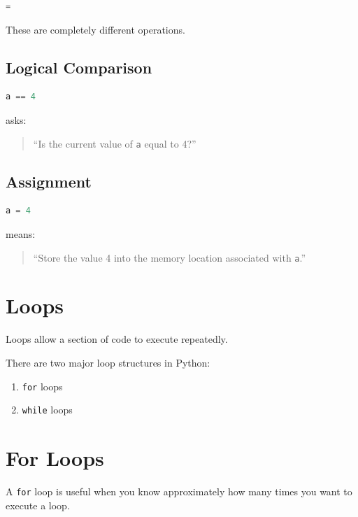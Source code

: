 \documentclass[11pt]{article}
\begin{document}
\begin{lstlisting}[language=Python]
=
\end{lstlisting}

These are completely different operations.

\subsection{Logical Comparison}

\begin{lstlisting}[language=Python]
a == 4
\end{lstlisting}

asks:

\begin{quote}
``Is the current value of \texttt{a} equal to 4?''
\end{quote}

\subsection{Assignment}

\begin{lstlisting}[language=Python]
a = 4
\end{lstlisting}

means:

\begin{quote}
``Store the value 4 into the memory location associated with \texttt{a}.''
\end{quote}

\section{Loops}

Loops allow a section of code to execute repeatedly.

There are two major loop structures in Python:

\begin{enumerate}
    \item \texttt{for} loops
    \item \texttt{while} loops
\end{enumerate}

\section{For Loops}

A \texttt{for} loop is useful when you know approximately how many times you want to execute a loop.
\end{document}
